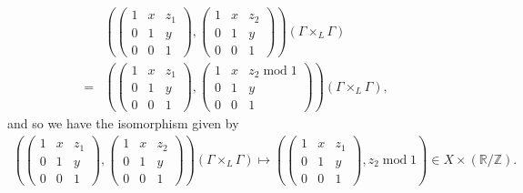 \documentclass[12pt]{article}
\theoremstyle{plain} %
\theoremstyle{definition} %
\theoremstyle{plain}
\theoremstyle{plain}
\numberwithin{equation}{section}
\newcommand{\Z}{\mathbb{Z}}
\newcommand{\R}{\mathbb{R}}
\newcommand{\1}{\mathbbm{1}}
\renewcommand{\mod}{\operatorname{mod}}
\begin{document}
\begin{align*}
&
\left(
        \begin{pmatrix}
            1 & x & z_1\\
            0 & 1 & y\\
            0 & 0 & 1
            \end{pmatrix},\begin{pmatrix}
            1 & x & z_2\\
            0 & 1 & y\\
            0 & 0 & 1
            \end{pmatrix}\right)(\Gamma\times_L \Gamma) \\
            =&
            \left(
        \begin{pmatrix}
            1 & x  & z_1\\
            0 & 1 & y \\
            0 & 0 & 1
            \end{pmatrix},\begin{pmatrix}
            1 & x& z_2\mod 1\\
            0 & 1 & y\\
            0 & 0 & 1
 \end{pmatrix}\right)(\Gamma\times_L \Gamma),
\end{align*}
and so we have the isomorphism given by
\begin{align*}
    \left(
        \begin{pmatrix}
            1 & x & z_1\\
            0 & 1 & y\\
            0 & 0 & 1
            \end{pmatrix},\begin{pmatrix}
            1 & x & z_2\\
            0 & 1 & y\\
            0 & 0 & 1
            \end{pmatrix}\right)(\Gamma\times_L \Gamma) \mapsto  \left(\begin{pmatrix}
            1 & x & z_1\\
            0 & 1 & y\\
            0 & 0 & 1
            \end{pmatrix},z_2 \mod 1\right)\in X\times (\R/\Z).
\end{align*}
\end{document}
